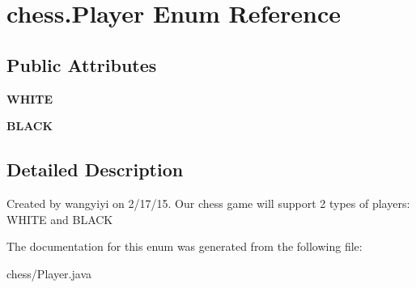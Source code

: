 \hypertarget{enumchess_1_1_player}{}\section{chess.\+Player Enum Reference}
\label{enumchess_1_1_player}
\subsection*{Public Attributes}
\begin{DoxyCompactItemize}
\item 
\hypertarget{enumchess_1_1_player_a84b2a8e54124863c85dbaea47e2c61b3}{}{\bfseries W\+H\+I\+T\+E}\label{enumchess_1_1_player_a84b2a8e54124863c85dbaea47e2c61b3}

\item 
\hypertarget{enumchess_1_1_player_afd78ad692be185f20a8ac3c4224f286e}{}{\bfseries B\+L\+A\+C\+K}\label{enumchess_1_1_player_afd78ad692be185f20a8ac3c4224f286e}

\end{DoxyCompactItemize}


\subsection{Detailed Description}
Created by wangyiyi on 2/17/15. Our chess game will support 2 types of players\+: W\+H\+I\+T\+E and B\+L\+A\+C\+K 

The documentation for this enum was generated from the following file\+:\begin{DoxyCompactItemize}
\item 
chess/Player.\+java\end{DoxyCompactItemize}
